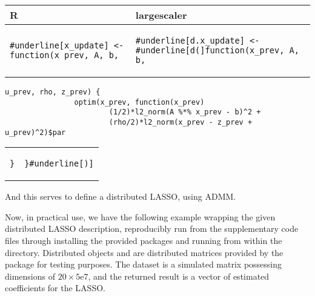 \documentclass[letterpaper, inpress]{jds} %
\begin{document}
\begin{table}[H]
\centering
\begin{tabular}{p{} | p{}}
R & largescaler \\ \midrule
\begin{Verbatim}[commandchars=\#\[\]]
#underline[x_update] <- function(x_prev, A, b,
\end{Verbatim}
& 
\begin{Verbatim}[commandchars=\#\[\]]
#underline[d.x_update] <- #underline[d(]function(x_prev, A, b,
\end{Verbatim}
\end{tabular}
\begin{Verbatim}[commandchars=\#\[\]]
                     u_prev, rho, z_prev) {
                optim(x_prev, function(x_prev)
                        (1/2)*l2_norm(A %*% x_prev - b)^2 +
                        (rho/2)*l2_norm(x_prev - z_prev + u_prev)^2)$par
\end{Verbatim}
\begin{tabular}{p{} | p{}}
\begin{Verbatim}[commandchars=\#\[\]]
                 }
\end{Verbatim}
&
\begin{Verbatim}[commandchars=\#\[\]]
                 }#underline[)]
\end{Verbatim}
\\
\end{tabular}
\end{table}

And this serves to define a distributed LASSO, using ADMM.

Now, in practical use, we have the following example wrapping the given distributed LASSO description, reproducibly run from the supplementary code files through installing the provided packages and running  from within the  directory. 
Distributed objects  and  are distributed matrices provided by the package for testing purposes.
The dataset  is a simulated matrix possessing dimensions of $20 \times 5\mathrm{e}7$, and the returned result is a vector of estimated coefficients for the LASSO.
\end{document}
